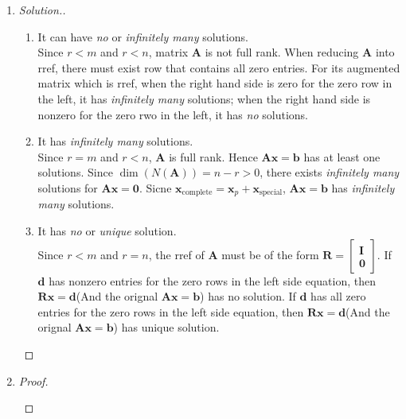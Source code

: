 \begin{enumerate}
\begin{proof}
\begin{enumerate}
Hence $\Span\{5,\cos^2x\}=\{5,\cos 2x,\cos^2x\}$. $\{5,\cos^2x\}$ is the basis for $\Span\{5,\cos 2x,\cos^2x\}.$ Hence $\dim(\Span\{5,\cos 2x,\cos^2x\})=2.$
\end{enumerate}
\end{proof}
\item
\begin{proof}[Solution.]
\begin{enumerate}
\item
It can have \emph{no} or \emph{infinitely many} solutions.\\
Since $r<m$ and $r<n$, matrix $\bm A$ is not full rank. When reducing $\bm A$ into rref, there must exist row that contains all zero entries. For its augmented matrix which is rref, when the right hand side is zero for the zero row in the left, it has \emph{infinitely many} solutions; when the right hand side is nonzero for the zero rwo in the left, it has \emph{no} solutions.
\item
It has \emph{infinitely many} solutions.\\
Since $r=m$ and $r<n$, $\bm A$ is full rank. Hence $\bm{Ax} = \bm b$ has at least one solutions. Since $\dim(N(\bm A)) = n-r>0$, there exists \emph{infinitely many} solutions for $\bm{Ax} = \bm 0$. Sicne $\bm x_{\text{complete}} = \bm x_p + \bm x_{\text{special}}$, $\bm{Ax} = \bm b$ has \emph{infinitely many} solutions.
\item
It has \emph{no} or \emph{unique} solution.\\
Since $r<m$ and $r=n$, the rref of $\bm A$ must be of the form $\bm R = \begin{bmatrix}
\bm I\\\bm 0
\end{bmatrix}$. If $\bm d$ has nonzero entries for the zero rows in the left side equation, then $\bm{Rx} = \bm d$(And the orignal $\bm{Ax} = \bm b$) has no solution. If $\bm d$ has all zero entries for the zero rows in the left side equation, then $\bm{Rx} = \bm d$(And the orignal $\bm{Ax} = \bm b$) has unique solution.
\end{enumerate}
\end{proof}
\item
\begin{proof}
\begin{enumerate}


\end{enumerate}
\end{proof}
\end{enumerate}
